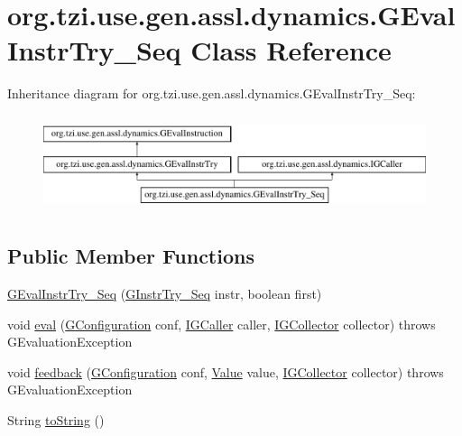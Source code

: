 \hypertarget{classorg_1_1tzi_1_1use_1_1gen_1_1assl_1_1dynamics_1_1_g_eval_instr_try___seq}{\section{org.\-tzi.\-use.\-gen.\-assl.\-dynamics.\-G\-Eval\-Instr\-Try\-\_\-\-Seq Class Reference}
\label{classorg_1_1tzi_1_1use_1_1gen_1_1assl_1_1dynamics_1_1_g_eval_instr_try___seq}
}
Inheritance diagram for org.\-tzi.\-use.\-gen.\-assl.\-dynamics.\-G\-Eval\-Instr\-Try\-\_\-\-Seq\-:\begin{figure}[H]
\begin{center}
\leavevmode
\includegraphics[height=2.837838cm]{classorg_1_1tzi_1_1use_1_1gen_1_1assl_1_1dynamics_1_1_g_eval_instr_try___seq}
\end{center}
\end{figure}
\subsection*{Public Member Functions}
\begin{DoxyCompactItemize}
\item 
\hyperlink{classorg_1_1tzi_1_1use_1_1gen_1_1assl_1_1dynamics_1_1_g_eval_instr_try___seq_a412fd9c1ba67654b4a0eeb4871048569}{G\-Eval\-Instr\-Try\-\_\-\-Seq} (\hyperlink{classorg_1_1tzi_1_1use_1_1gen_1_1assl_1_1statics_1_1_g_instr_try___seq}{G\-Instr\-Try\-\_\-\-Seq} instr, boolean first)
\item 
void \hyperlink{classorg_1_1tzi_1_1use_1_1gen_1_1assl_1_1dynamics_1_1_g_eval_instr_try___seq_adb3d34915cfa92970ed8aef04e377b95}{eval} (\hyperlink{classorg_1_1tzi_1_1use_1_1gen_1_1assl_1_1dynamics_1_1_g_configuration}{G\-Configuration} conf, \hyperlink{interfaceorg_1_1tzi_1_1use_1_1gen_1_1assl_1_1dynamics_1_1_i_g_caller}{I\-G\-Caller} caller, \hyperlink{interfaceorg_1_1tzi_1_1use_1_1gen_1_1assl_1_1dynamics_1_1_i_g_collector}{I\-G\-Collector} collector)  throws G\-Evaluation\-Exception 
\item 
void \hyperlink{classorg_1_1tzi_1_1use_1_1gen_1_1assl_1_1dynamics_1_1_g_eval_instr_try___seq_a75e01f4e93d343168136b37d4a237311}{feedback} (\hyperlink{classorg_1_1tzi_1_1use_1_1gen_1_1assl_1_1dynamics_1_1_g_configuration}{G\-Configuration} conf, \hyperlink{classorg_1_1tzi_1_1use_1_1uml_1_1ocl_1_1value_1_1_value}{Value} value, \hyperlink{interfaceorg_1_1tzi_1_1use_1_1gen_1_1assl_1_1dynamics_1_1_i_g_collector}{I\-G\-Collector} collector)  throws G\-Evaluation\-Exception 
\item 
String \hyperlink{classorg_1_1tzi_1_1use_1_1gen_1_1assl_1_1dynamics_1_1_g_eval_instr_try___seq_a4c7be8fa6e5237f9ed95b5d25ddb9534}{to\-String} ()
\end{DoxyCompactItemize}
